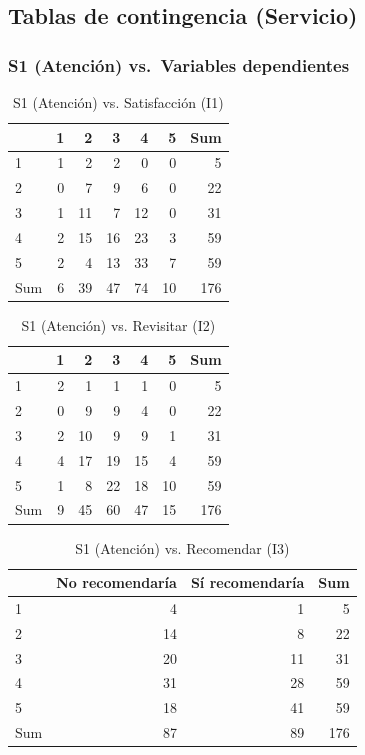\documentclass[
  spanish,
]{article}
\begin{document}
\newpage

\subsection{Tablas de contingencia
(Servicio)}\label{tablas-de-contingencia-servicio}

\subsubsection{S1 (Atención) vs.~Variables
dependientes}\label{s1-atenciuxf3n-vs.-variables-dependientes}

\begin{longtable}[t]{lrrrrrr}
\caption{\label{tab:cont-s1-satisf}S1 (Atención) vs. Satisfacción (I1)}\\
\toprule
 & 1 & 2 & 3 & 4 & 5 & Sum\\
\midrule
1 & 1 & 2 & 2 & 0 & 0 & 5\\
2 & 0 & 7 & 9 & 6 & 0 & 22\\
3 & 1 & 11 & 7 & 12 & 0 & 31\\
4 & 2 & 15 & 16 & 23 & 3 & 59\\
5 & 2 & 4 & 13 & 33 & 7 & 59\\
\addlinespace
Sum & 6 & 39 & 47 & 74 & 10 & 176\\
\bottomrule
\end{longtable}

\begin{longtable}[t]{lrrrrrr}
\caption{\label{tab:cont-s1-revis}S1 (Atención) vs. Revisitar (I2)}\\
\toprule
 & 1 & 2 & 3 & 4 & 5 & Sum\\
\midrule
1 & 2 & 1 & 1 & 1 & 0 & 5\\
2 & 0 & 9 & 9 & 4 & 0 & 22\\
3 & 2 & 10 & 9 & 9 & 1 & 31\\
4 & 4 & 17 & 19 & 15 & 4 & 59\\
5 & 1 & 8 & 22 & 18 & 10 & 59\\
\addlinespace
Sum & 9 & 45 & 60 & 47 & 15 & 176\\
\bottomrule
\end{longtable}

\begin{longtable}[t]{lrrr}
\caption{\label{tab:cont-s1-recom}S1 (Atención) vs. Recomendar (I3)}\\
\toprule
 & No recomendaría & Sí recomendaría & Sum\\
\midrule
1 & 4 & 1 & 5\\
2 & 14 & 8 & 22\\
3 & 20 & 11 & 31\\
4 & 31 & 28 & 59\\
5 & 18 & 41 & 59\\
\addlinespace
Sum & 87 & 89 & 176\\
\bottomrule
\end{longtable}
\end{document}
